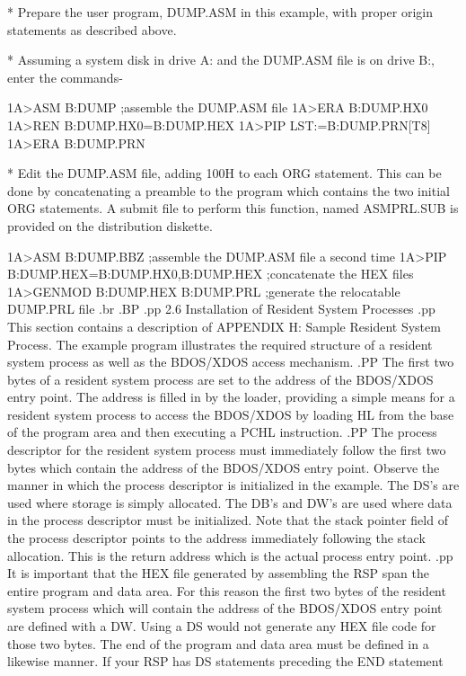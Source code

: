 	* Prepare the user program, DUMP.ASM in this example, with
	  proper origin statements as described above.

	* Assuming a system disk in drive A: and the DUMP.ASM file
	  is on drive B:, enter the commands-

	  1A>ASM B:DUMP
		;assemble the DUMP.ASM file
	  1A>ERA B:DUMP.HX0
	  1A>REN B:DUMP.HX0=B:DUMP.HEX
	  1A>PIP LST:=B:DUMP.PRN[T8]
	  1A>ERA B:DUMP.PRN

	* Edit the DUMP.ASM file, adding 100H to each ORG statement.
	  This can be done by concatenating a preamble to the
	  program which contains the two initial ORG statements.
	  A submit file to perform this function, named ASMPRL.SUB
	  is provided on the distribution diskette.

	  1A>ASM B:DUMP.BBZ
		;assemble the DUMP.ASM file a second time
	  1A>PIP B:DUMP.HEX=B:DUMP.HX0,B:DUMP.HEX
		;concatenate the HEX files
	  1A>GENMOD B:DUMP.HEX B:DUMP.PRL
		;generate the relocatable DUMP.PRL file
.br
.BP
.pp
2.6  Installation of Resident System Processes
.pp
This section contains a description of APPENDIX H:  Sample Resident
System Process.  The example program
illustrates the required structure of a resident system process as well
as the BDOS/XDOS access mechanism.
.PP
The first two bytes of a resident system process are set to the
address of the BDOS/XDOS entry point.  The address is filled in by the
loader, providing a simple means for a resident system process to
access the BDOS/XDOS by loading HL from the base of the program area and
then executing a PCHL instruction.
.PP
The process descriptor for the resident system process must immediately
follow the first two bytes which contain the address of the BDOS/XDOS
entry point.  Observe the manner in
which the process descriptor is initialized in the example.  The DS's
are used where storage is simply allocated. The DB's and DW's are used
where data in the process descriptor must be initialized.
Note that the stack pointer field of the process descriptor points to
the address immediately following the stack allocation.
This is the return address which is the actual process entry point.
.pp
It is important that the HEX file generated by assembling the RSP
span the entire program and data area.  For this reason the first two
bytes of the resident system process which will contain the address
of the BDOS/XDOS entry point are defined with a DW.  Using a DS
would not generate any HEX file code for those two bytes.
The end of the program and data area must be defined in a likewise
manner.  If your RSP has DS statements preceding the END statement
